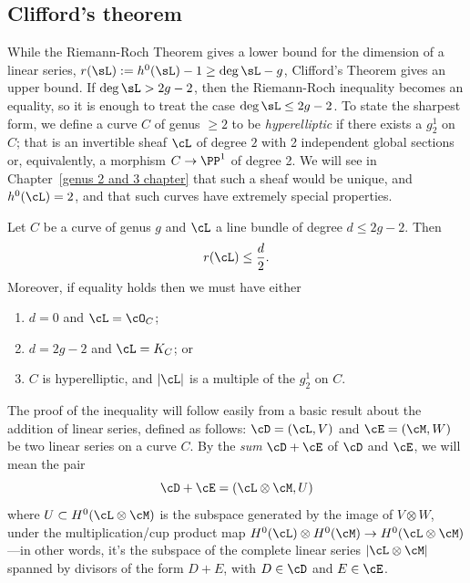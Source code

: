 \subsection{Clifford's theorem}

While the Riemann-Roch Theorem gives a lower bound for the dimension of a linear series, $r(\sL) := h^0(\sL)-1 \geq \deg \sL -g$, Clifford's Theorem
gives an upper bound. If $\deg \sL>2g-2$, then the Riemann-Roch inequality becomes an equality, so it is enough to treat the case $\deg \sL \leq 2g-2$.
To state the sharpest form, we define a curve $C$ of genus $\geq 2$ to be \emph{hyperelliptic} if there exists a $g^1_2$ on $C$; that is an
invertible sheaf $\cL$ of degree $2$ with 2 independent global sections or, equivalently, a morphism $C\to \PP^1$ of degree 2. We will see in Chapter~\ref{genus 2 and 3 chapter} that such a sheaf would be unique, and $h^0(\cL) = 2$, and that such curves have extremely special properties.


\begin{theorem}\label{Clifford}
Let $C$ be a curve of genus $g$ and $\cL$ a line bundle of degree $d \leq 2g-2$. Then
$$
r(\cL) \leq \frac{d}{2}.
$$
Moreover, if  equality holds then we must have either
\begin{enumerate}
\item $d=0$ and $\cL = \cO_C$;
\item $d = 2g-2$ and $\cL = K_C$; or
\item $C$ is hyperelliptic, and $|\cL|$ is a multiple of the $g^1_2$ on $C$.
\end{enumerate}
\end{theorem}

The proof of the inequality will follow easily from a basic result about the addition of linear series, defined as follows:
$\cD = (\cL,V)$ and $\cE = (\cM, W)$ be two linear series on a curve $C$. By the \emph{sum} $\cD + \cE$ of $\cD$ and $\cE$, we will mean the pair 
$$
\cD + \cE = (\cL \otimes \cM, U) 
$$
where $U \subset H^0(\cL \otimes \cM)$ is the subspace generated by the image of $V \otimes W$, under the multiplication/cup product map $H^0(\cL) \otimes H^0(\cM) \to H^0(\cL \otimes \cM)$---in other words, it's the subspace of the complete linear series $|\cL\otimes \cM|$ spanned by divisors of the form $D+E$, with $D \in \cD$ and $E \in \cE$.
 
